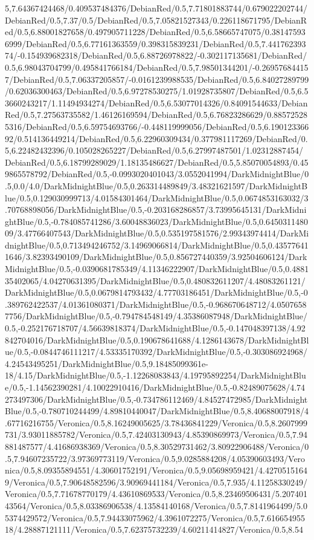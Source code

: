 {\begin{tikzternal}
5,7.64367424468/0.409537484376/DebianRed/0.5,7.71801883744/0.679022202744/DebianRed/0.5,7.37/0.5/DebianRed/0.5,7.05821527343/0.226118671795/DebianRed/0.5,6.88001827658/0.497905711228/DebianRed/0.5,6.58665747075/0.381475936999/DebianRed/0.5,6.77161363559/0.398315839231/DebianRed/0.5,7.44176239374/-0.154939682318/DebianRed/0.5,6.88726978822/-0.302117135681/DebianRed/0.5,6.98043704799/0.495841766184/DebianRed/0.5,7.98501344201/-0.269576844157/DebianRed/0.5,7.06337205857/-0.0161239988535/DebianRed/0.5,6.84027289799/0.62036300463/DebianRed/0.5,6.97278530275/1.01928735807/DebianRed/0.5,6.53660243217/1.11494934274/DebianRed/0.5,6.53077014326/0.84091544633/DebianRed/0.5,7.27563735582/1.46126169594/DebianRed/0.5,6.76823286629/0.885725285316/DebianRed/0.5,6.59754693766/-0.448119999056/DebianRed/0.5,6.19012336692/0.514136449214/DebianRed/0.5,6.22960309434/0.377981117269/DebianRed/0.5,6.22482432396/0.105028265227/DebianRed/0.5,6.27997487501/1.02312887454/DebianRed/0.5,6.18799289029/1.18135486627/DebianRed/0.5,5.85070054893/0.459865578792/DebianRed/0.5,-0.0993020401043/3.0552041994/DarkMidnightBlue/0.5,0.0/4.0/DarkMidnightBlue/0.5,0.263314489849/3.48321621597/DarkMidnightBlue/0.5,0.129030999713/4.01584301464/DarkMidnightBlue/0.5,0.0674853163032/3.70768898056/DarkMidnightBlue/0.5,-0.203168286857/3.73995645131/DarkMidnightBlue/0.5,-0.784085741286/3.60048836023/DarkMidnightBlue/0.5,0.645031148009/3.47766407543/DarkMidnightBlue/0.5,0.535197581576/2.99343974414/DarkMidnightBlue/0.5,0.713494246752/3.14969066814/DarkMidnightBlue/0.5,0.435776411646/3.82393490109/DarkMidnightBlue/0.5,0.856727440359/3.92504606124/DarkMidnightBlue/0.5,-0.0390681785349/4.11346222907/DarkMidnightBlue/0.5,0.488135402065/4.04270631395/DarkMidnightBlue/0.5,0.480832611207/4.48083261121/DarkMidnightBlue/0.5,0.0679814793432/4.77703186451/DarkMidnightBlue/0.5,-0.389762422537/4.01361080371/DarkMidnightBlue/0.5,-0.968670648712/4.05076587756/DarkMidnightBlue/0.5,-0.794784548149/4.35386087948/DarkMidnightBlue/0.5,-0.252176718707/4.56639818374/DarkMidnightBlue/0.5,-0.147048397138/4.92842704016/DarkMidnightBlue/0.5,0.190678641688/4.1286143678/DarkMidnightBlue/0.5,-0.0844746111217/4.53335170392/DarkMidnightBlue/0.5,-0.303086924968/4.24543495251/DarkMidnightBlue/0.5,9.18485099361e-18/4.15/DarkMidnightBlue/0.5,-1.12268083843/4.19795892254/DarkMidnightBlue/0.5,-1.14562390281/4.10022910416/DarkMidnightBlue/0.5,-0.82489075628/4.74273497306/DarkMidnightBlue/0.5,-0.734786112469/4.84527472985/DarkMidnightBlue/0.5,-0.780710244499/4.89810440047/DarkMidnightBlue/0.5,8.40688007918/4.67716216755/Veronica/0.5,8.16249005625/3.78436841229/Veronica/0.5,8.2607999731/3.93011885782/Veronica/0.5,7.42403130943/4.85390869973/Veronica/0.5,7.94881487577/4.41686938369/Veronica/0.5,8.30529731462/3.80922906488/Veronica/0.5,7.94607235722/3.97369773119/Veronica/0.5,9.0285884208/4.05390603493/Veronica/0.5,8.09355894551/4.30601752191/Veronica/0.5,9.05698959421/4.42705151649/Veronica/0.5,7.90648582596/3.90969441184/Veronica/0.5,7.935/4.11258330249/Veronica/0.5,7.71678770179/4.43610869533/Veronica/0.5,8.23469506431/5.20740143564/Veronica/0.5,8.03386906538/4.13584140168/Veronica/0.5,7.8141964499/5.05374429572/Veronica/0.5,7.94433075962/4.3961072275/Veronica/0.5,7.61665495518/4.28887121111/Veronica/0.5,7.62375732239/4.60211414827/Veronica/0.5,8.54
\end{tikzternal}}
